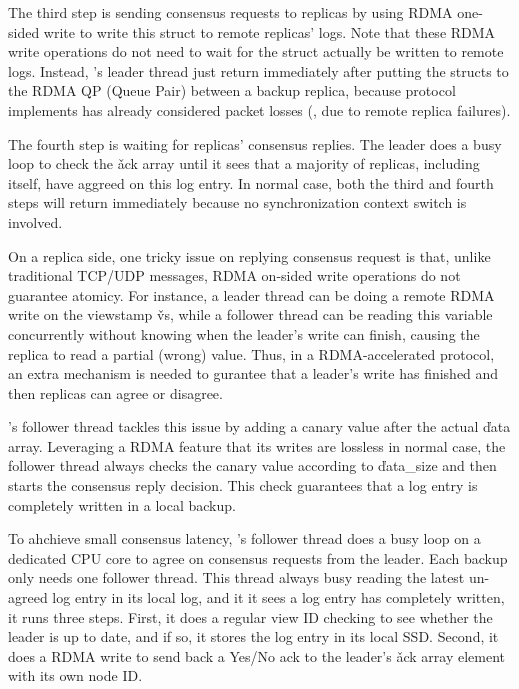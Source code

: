 The third step is sending consensus requests to replicas by using RDMA 
one-sided write to write this struct to remote replicas' logs. Note that these 
RDMA write operations do not need to wait for the struct actually be written to 
remote logs. Instead, \xxx's leader thread just return immediately after 
putting the structs to the RDMA QP (Queue Pair) between a backup replica, 
because \paxos protocol \xxx implements has already considered packet losses 
(\eg, due to remote replica failures).

The fourth step is waiting for replicas' consensus replies. The leader does a
busy loop to check the \v{ack} array until it sees that a majority of replicas, 
including itself, have aggreed on this log entry. In normal case, both the 
third and fourth steps will return immediately because no synchronization 
context switch is involved.


On a replica side, one tricky issue on replying consensus request is that, 
unlike traditional TCP/UDP messages, RDMA on-sided write operations do not 
guarantee atomicy. For instance, a leader thread can be doing a remote RDMA 
write on the viewstamp \v{vs}, while a follower thread can be reading this 
variable concurrently without knowing when the leader's write can finish, 
causing the replica to read a partial (wrong) value. Thus, in a 
RDMA-accelerated protocol, an extra mechanism is needed to gurantee that a 
leader's write has finished and then replicas can agree or disagree.

\xxx's follower thread tackles this issue by adding a canary value after the 
actual \v{data} array. Leveraging a RDMA feature that its writes are lossless 
in normal case, the follower thread always checks the canary value according to 
\v{data\_size} and then starts the consensus reply decision. This check 
guarantees that a log entry is completely written in a local backup.

To ahchieve small consensus latency, \xxx's follower thread does a busy loop 
on a dedicated CPU core to agree on consensus requests from the leader. Each 
backup only needs one follower thread. This thread always busy reading the 
latest un-agreed log entry in its local log, and it it sees a log entry has 
completely written, it runs three steps. First, it does a regular \paxos view 
ID checking to see whether the leader is up to date, and if so, it stores the 
log entry in its local SSD. Second, it does a RDMA write to send back a Yes/No 
ack to the leader's \v{ack} array element with its own node ID.

